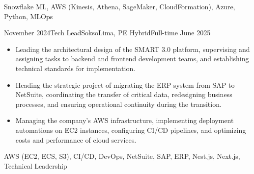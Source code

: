 \begin{experiences}
{{\begin{itemize}
      \end{itemize}
    }
  }
  {Snowflake ML, {AWS (Kinesis, Athena, SageMaker, CloudFormation)}, Azure, Python, MLOps}

\experience
  {November 2024}{Tech Lead}{Sokso}{Lima, PE}
  {Hybrid}{Full-time}
  {June 2025} {
    \begin{itemize}
      \item Leading the architectural design of the SMART 3.0 platform, supervising and assigning tasks to backend and frontend development teams, and establishing technical standards for implementation.
      \item Heading the strategic project of migrating the ERP system from SAP to NetSuite, coordinating the transfer of critical data, redesigning business processes, and ensuring operational continuity during the transition.
      \item Managing the company's AWS infrastructure, implementing deployment automations on EC2 instances, configuring CI/CD pipelines, and optimizing costs and performance of cloud services.
    \end{itemize}
  }
  {{AWS (EC2, ECS, S3)}, CI/CD, DevOps, NetSuite, SAP, ERP, Nest.js, Next.js, Technical Leadership}


\end{experiences}
